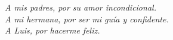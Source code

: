 \begin{dedication}
    \textit{A mis padres, por su amor incondicional.}\\
    \textit{A mi hermana, por ser mi guía y confidente.}\\
    \textit{A Luis, por hacerme feliz.}
\end{dedication}